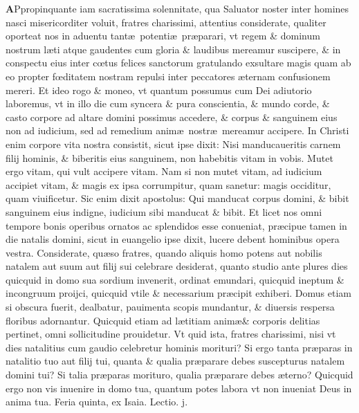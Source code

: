 \documentclass[a5paper,10pt]{book}
\def\ae{æ}
\def\oe{œ}
\begin{document}
\begin{multicols*}{2}
\vspace{-1.5em}
\lettrine[lines=2]{\bfseries \color{red} A}{}Ppropinquante iam sacratissima solennitate, qua Saluator noster inter homines nasci misericorditer voluit, fratres charissimi, attentius considerate, qualiter oporteat nos in aduentu tant\ae \ potenti\ae \ pr\ae parari, vt regem \& dominum nostrum l\ae ti atque gaudentes cum gloria \& laudibus mereamur suscipere, \& in conspectu eius inter c\oe tus felices sanctorum gratulando exsultare magis quam ab eo propter f\oe ditatem nostram repulsi inter peccatores \ae ternam confusionem mereri.
Et ideo rogo \& moneo, vt quantum possumus cum Dei adiutorio laboremus, vt in illo die cum syncera \& pura conscientia, \& mundo corde, \& casto corpore ad altare domini possimus accedere, \& corpus \& sanguinem eius non ad iudicium, sed ad remedium anim\ae \ nostr\ae \ mereamur accipere.
In Christi enim corpore vita nostra consistit, sicut ipse dixit: Nisi manducaueritis carnem filij hominis, \& biberitis eius sanguinem, non habebitis vitam in vobis.
Mutet ergo vitam, qui vult accipere vitam.
Nam si non mutet vitam, ad iudicium accipiet vitam, \& magis ex ipsa corrumpitur, quam sanetur: magis occiditur, quam viuificetur.
Sic enim dixit apostolus: Qui manducat corpus domini, \& bibit sanguinem eius indigne, iudicium sibi manducat \& bibit.
Et licet nos omni tempore bonis operibus ornatos ac splendidos esse conueniat, pr\ae cipue tamen in die natalis domini, sicut in euangelio ipse dixit, lucere debent hominibus opera vestra.
Considerate, qu\ae so fratres, quando aliquis homo potens aut nobilis natalem aut suum aut filij sui celebrare desiderat, quanto studio ante plures dies quicquid in domo sua sordium invenerit, ordinat emundari, quicquid ineptum \& incongruum proijci, quicquid vtile \& necessarium pr\ae cipit exhiberi.
Domus etiam si obscura fuerit, dealbatur, pauimenta scopis mundantur, \& diuersis respersa floribus adornantur.
Quicquid etiam ad l\ae titiam anim\ae \& corporis delitias pertinet, omni sollicitudine prouidetur.
Vt quid ista, fratres charissimi, nisi vt dies natalitius cum gaudio celebretur hominis morituri?
Si ergo tanta pr\ae paras in natalitio tuo aut filij tui, quanta \& qualia pr\ae parare debes suscepturus natalem domini tui?
Si talia pr\ae paras morituro, qualia pr\ae parare debes \ae terno?
Quicquid ergo non vis inuenire in domo tua, quantum potes labora vt non inueniat Deus in anima tua.
\newline {} \color{red} \hypertarget{THU-PRIMA-ADV}{Feria quinta,} ex Isaia. \hfill Lectio. j. \color{black}

\end{multicols*}
\end{document}
